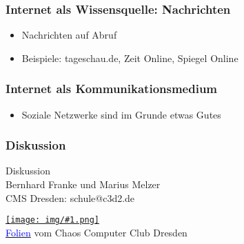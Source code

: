 \documentclass[12pt]{beamer}
\newcommand{\cc}[1]{\texttt{[image: img/\#1.png]}}
\begin{document}
\begin{frame}
  \frametitle{Internet als Wissensquelle: Nachrichten}
  \begin{itemize}
    \item<2-> Nachrichten auf Abruf
    \item<3-> Beispiele: tageschau.de, Zeit Online, Spiegel Online
  \end{itemize}
\end{frame}

\begin{frame}
  \frametitle{Internet als Kommunikationsmedium}
  \begin{itemize}
    \item<2-> Soziale Netzwerke sind im Grunde etwas Gutes
  \end{itemize}
\end{frame}

\begin{frame}
    \frametitle{Diskussion}
    \begin{center} {\Large Diskussion}\\Bernhard Franke und Marius Melzer\\CMS Dresden: schule@c3d2.de \end{center}
    \begin{center}
      \href{https://creativecommons.org/licenses/by-sa/4.0/}{\cc{by-sa}} \\
      \href{}{\textcolor{blue}{Folien}} vom Chaos Computer Club Dresden
    \end{center}
\end{frame}
\end{document}
